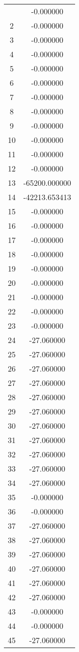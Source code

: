 \documentclass[12pt]{article}
\begin{document}
\begin{longtable}{@{}cc@{}}
\bottomrule
\endlastfoot
1 & -0.000000 \\
2 & -0.000000 \\
3 & -0.000000 \\
4 & -0.000000 \\
5 & -0.000000 \\
6 & -0.000000 \\
7 & -0.000000 \\
8 & -0.000000 \\
9 & -0.000000 \\
10 & -0.000000 \\
11 & -0.000000 \\
12 & -0.000000 \\
13 & -65200.000000 \\
14 & -42213.653413 \\
15 & -0.000000 \\
16 & -0.000000 \\
17 & -0.000000 \\
18 & -0.000000 \\
19 & -0.000000 \\
20 & -0.000000 \\
21 & -0.000000 \\
22 & -0.000000 \\
23 & -0.000000 \\
24 & -27.060000 \\
25 & -27.060000 \\
26 & -27.060000 \\
27 & -27.060000 \\
28 & -27.060000 \\
29 & -27.060000 \\
30 & -27.060000 \\
31 & -27.060000 \\
32 & -27.060000 \\
33 & -27.060000 \\
34 & -27.060000 \\
35 & -0.000000 \\
36 & -0.000000 \\
37 & -27.060000 \\
38 & -27.060000 \\
39 & -27.060000 \\
40 & -27.060000 \\
41 & -27.060000 \\
42 & -27.060000 \\
43 & -0.000000 \\
44 & -0.000000 \\
45 & -27.060000 \\

\end{longtable}
\end{document}
